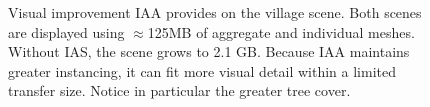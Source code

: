 




\begin{figure}
\centering
{}
\caption{Visual improvement IAA provides on the village scene. Both
  scenes are displayed using $\approx$125MB of aggregate and individual meshes.  
  Without IAS, the scene grows to 2.1 GB. Because IAA maintains
  greater instancing, it can fit more visual detail within a limited
  transfer size. Notice in particular the greater tree cover.}
\label{fig:village-iaa}
\vspace{-12pt}
\end{figure}

